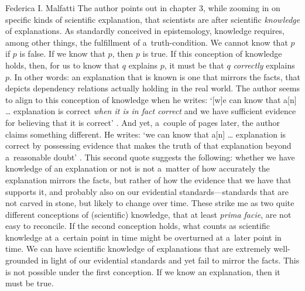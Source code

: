 \begin{recengenv}{Federica I. Malfatti}
\enlargethispage{1.5\baselineskip}
The author points out in chapter 3, while zooming in on specific kinds of scientific explanation, that scientists are after scientific \textit{knowledge} of explanations. As standardly conceived in epistemology, knowledge requires, among other things, the fulfillment of a~truth-condition. We cannot know that $p$ if $p$ is false. If we know that $p$, then $p$ is true. If this conception of knowledge holds, then, for us to know that $q$ explains $p$, it must be that $q$ \textit{correctly} explains $p$. In other words: an explanation that is known is one that mirrors the facts, that depicts dependency relations actually holding in the real world. The author seems to align to this conception of knowledge when he writes: ‘[w]e can know that a[n] … explanation is correct \textit{when it is in fact correct} and we have sufficient evidence for believing that it is correct'
\parencite[][p.38, emphasis added]{mccain_understanding_2022}. %
 And yet, a~couple of pages later, the author claims something different. He writes: ‘we can know that a[n] … explanation is correct by possessing evidence that makes the truth of that explanation beyond a~reasonable doubt' 
\parencite[][p.40]{mccain_understanding_2022}. %
 This second quote suggests the following: whether we have knowledge of an explanation or not is not a~matter of how accurately the explanation mirrors the facts, but rather of how the evidence that we have that supports it, and probably also on our evidential standards---standards that are not carved in stone, but likely to change over time. These strike me as two quite different conceptions of (scientific) knowledge, that at least \textit{prima facie}, are not easy to reconcile. If the second conception holds, what counts as scientific knowledge at a~certain point in time might be overturned at a~later point in time. We can have scientific knowledge of explanations that are extremely well-grounded in light of our evidential standards and yet fail to mirror the facts. This is not possible under the first conception. If we know an explanation, then it must be true.


\end{recengenv}
